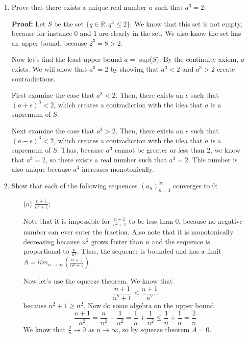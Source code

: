 \documentclass[11pt]{article}
\begin{document}
\begin{enumerate}
\bigskip
\rightline{$\Box$}

\item
Prove that there exists a unique real number $a$ such that $a^3 = 2$. 

\bigskip
\textbf{Proof: } Let $S$ be the set $\{q \in \mathbb{R} : q^3 \leq 2\}$. We know that this set is not empty, because for instance $0$ and $1$ are clearly in the set. We also know the set has an upper bound, because $2^3 = 8 > 2$. 

\medskip
Now let's find the least upper bound $a = $ sup($S$). By the continuity axiom, $a$ exists. We will show that $a^3 = 2$ by showing that $a^3 < 2$ and $a^3>2$ create contradictions. 

First examine the case that $a^3 < 2$. Then, there exists an $\epsilon $ such that $ (a+ \epsilon)^3 < 2$, which creates a contradiction with the idea that $a$ is a supremum of $S$. 

Next examine the case that $a^3 > 2$. Then, there exists an $\epsilon $ such that $ (a- \epsilon)^3 < 2$, which creates a contradiction with the idea that $a$ is a supremum of $S$.  Thus, because $a^3$ cannot be greater or less than $2$, we know that $a^3 = 2$, so there exists a real number such that $a^3 = 2$. This number is also unique because $a^3$ increases monotonically. 

\rightline{$\Box$}


\item
Show that each of the following sequences $(a_n)_{n=1}^\infty$ converges to $0$:
\begin{itemize}
\item[(a)] $\frac{n+1}{n^2 + 1}$;

\medskip
Note that it is impossible for $\frac{n+1}{n^2 + 1}$ to be less than $0$, because no negative number can ever enter the fraction. Also note that it is monotonically decreasing because $n^2$ grows faster than $n$ and the sequence is proportional to $\frac{n}{n^2}$. Thus, the sequence is bounded and has a limit $A = lim_{n\rightarrow \infty}(\frac{n+1}{n^2 + 1})$.

Now let's use the squeeze theorem. We know that
\[\frac{n+1}{n^2+1} \leq \frac{n+1}{n^2} \]
because $n^2+1 \geq n^2$. Now do some algebra on the upper bound:
\[ \frac{n+1}{n^2}  = \frac{n}{n^2} + \frac{1}{n^2} =  \frac{1}{n} + \frac{1}{n^2} \leq \frac{1}{n}+\frac{1}{n} = \frac{2}{n}\]
We know that $\frac{2}{n} \rightarrow 0$ as $n \rightarrow \infty$, so by squeeze theorem $A = 0$.

\rightline{$\Box$}


\end{itemize}
\end{enumerate}
\end{document}
